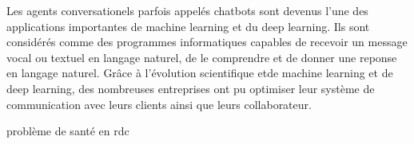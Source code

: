 Les agents conversationels parfois appelés chatbots sont devenus l'une des applications importantes de machine learning et du deep learning.
Ils sont considérés comme des programmes informatiques capables de recevoir un message vocal ou textuel en langage naturel,
de le comprendre et de donner une reponse en langage naturel.
Grâce à l'évolution scientifique etde machine learning et de deep learning, des nombreuses entreprises ont pu optimiser leur système de communication avec leurs clients ainsi que leurs collaborateur.



problème de santé en rdc
